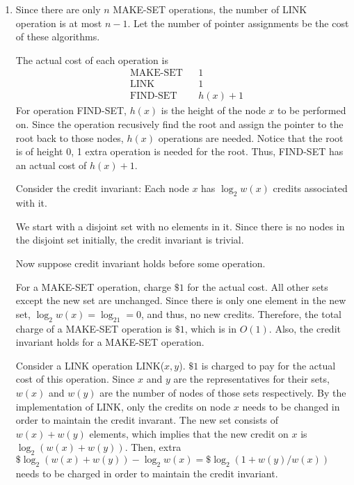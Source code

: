 \documentclass[10pt]{article}
\begin{document}
\begin{enumerate}
\begin{comment}
	Consider the following credit invariant: 
		Each node $x$ has $\log_2(w(x))$ credits associated with it. 
	\end{comment}
	\item
		Since there are only $n$ MAKE-SET operations, the number of LINK
		operation is at most $n-1$.
		Let the number of pointer assignments be the cost of these algorithms. 
		
		The actual cost of each operation is 
		\begin{align*}
			&\text{MAKE-SET}	&&  1 \\
			&\text{LINK}		&&  1 \\
			&\text{FIND-SET}	&&  h(x)+1
		\end{align*}
		For operation FIND-SET, $h(x)$ is the height of the node $x$ to be
		performed on.
		Since the operation recusively find the root and assign the pointer to
		the root back to those nodes, $h(x)$ operations are needed.
		Notice that the root is of height 0, 1 extra operation is needed for the
		root.
		Thus, FIND-SET has an actual cost of $h(x)+1$.

		Consider the credit invariant: Each node $x$ has $\log_2w(x)$ credits
		associated with it.

		We start with a disjoint set with no elements in it.
		Since there is no nodes in the disjoint set initially, the credit
		invariant is trivial.


		Now suppose credit invariant holds before some operation.

		For a MAKE-SET operation, charge $\$1$ for the actual cost.
		All other sets except the new set are unchanged.
		Since there is only one element in the new set, $\log_2w(x) = \log_21 =
		0$, and thus, no new credits.
		Therefore, the total charge of a MAKE-SET operation is $\$1$, which is
		in $O(1)$.
		Also, the credit invariant holds for a MAKE-SET operation.


		Consider a LINK operation LINK($x, y$).
		$\$1$ is charged to pay for the actual cost of this operation.
		Since $x$ and $y$ are the representatives for their sets, $w(x)$ and
		$w(y)$ are the number of nodes of those sets respectively. 
		By the implementation of LINK, only the credits on node $x$ needs to be
		changed in order to maintain the credit invarant.
		The new set consists of $w(x)+w(y)$ elements, which implies that the
		new credit on $x$ is $\log_2(w(x)+w(y))$.
		Then, extra $\$\log_2(w(x)+w(y)) - \log_2w(x) = \$\log_2(1+w(y)/w(x))$
		needs to be charged in order to maintain the credit invariant. 


\end{enumerate}
\end{document}
